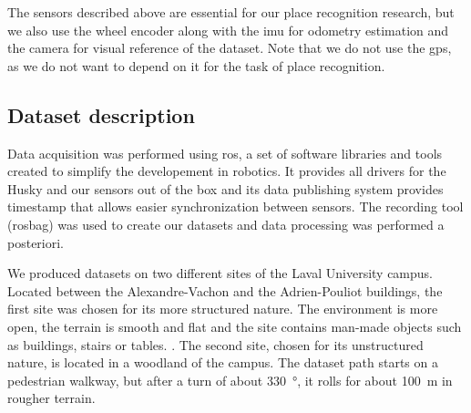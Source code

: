 The sensors described above are essential for our place recognition research, but we also use the wheel encoder along with the \gls*{imu} for odometry estimation and the camera for visual reference of the dataset. Note that we do not use the \gls*{gps}, as we do not want to depend on it for the task of place recognition.


\subsection{Dataset description}
\label{ssec:chap_slam_platform}

Data acquisition was performed using \gls*{ros}, a set of software libraries and tools created to simplify the developement in robotics. It provides all drivers for the Husky and our sensors out of the box and its data publishing system provides timestamp that allows easier synchronization between sensors. The recording tool (rosbag) was used to create our datasets and data processing was performed a posteriori.

We produced datasets on two different sites of the Laval University campus. Located between the Alexandre-Vachon and the Adrien-Pouliot buildings, the first site was chosen for its more structured nature. The environment is more open, the terrain is smooth and flat and the site contains man-made objects such as buildings, stairs or tables. . The second site, chosen for its unstructured nature, is located in a woodland of the campus. The dataset path starts on a pedestrian walkway, but after a turn of about \SI{330}{\degree}, it rolls for about \SI{100}{\meter} in rougher terrain. 

